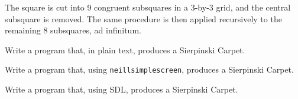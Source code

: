 

The square is cut into 9 congruent subsquares in a 3-by-3 grid, and
the central subsquare is removed. The same procedure is then applied
recursively to the remaining 8 subsquares, ad infinitum.



\begin{exercise}
Write a program that, in plain text, produces a Sierpinski Carpet.
\end{exercise}

\begin{exercise}
Write a program that, using \verb^neillsimplescreen^,
produces a Sierpinski Carpet.
\end{exercise}

\begin{exercise}
Write a program that, using SDL, produces a Sierpinski Carpet.
\end{exercise}
